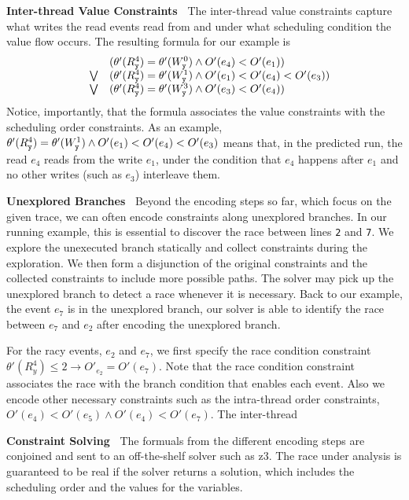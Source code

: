 {\bf Inter-thread Value Constraints\ } The inter-thread value constraints capture what writes the read events read from and under what scheduling condition the value flow occurs.  The resulting formula for our example is
$$
\begin{array}{lcl}
	& & (\theta'(R_{\tt y}^4)=\theta'(W_{\tt y}^0) \wedge O'(e_4) < O'(e_1) ) \\
& \bigvee &
	(\theta'(R_{\tt y}^4)=\theta'(W_{\tt y}^1) \wedge O'(e_1) < O'(e_4) < O'(e_3)) \\
& \bigvee &
	(\theta'(R_{\tt y}^4)=\theta'(W_{\tt y}^3) \wedge O'(e_3) < O'(e_4))
\end{array}
$$    
Notice, importantly, that the formula associates the value constraints with the scheduling order constraints. 
 As an example, 
$\theta'(R_{\tt y}^4)=\theta'(W_{\tt y}^1) \wedge O'(e_1) < O'(e_4) < O'(e_3)$ means that, in the predicted run, the read $e_4$ reads from the write $e_1$, under the condition that $e_4$ happens after $e_1$ and no other  writes (such as $e_3$) interleave them.



{\bf Unexplored Branches\ } Beyond the encoding steps so far, which focus on the given trace, we can often encode constraints along unexplored branches. In our running example, this is essential to discover the race between lines {\tt 2} and {\tt 7}. We explore the unexecuted branch statically and collect constraints during the exploration. We then form a disjunction  of the original constraints and the collected constraints to include more possible  paths. The solver may pick up the unexplored branch to detect a race whenever it is necessary. Back to our example, the event $e_7$ is in the unexplored branch, our solver is able to identify the race between $e_7$ and $e_2$ after encoding the unexplored branch. 

For the racy events, $e_2$ and $e_7$, we first specify the race condition constraint  $\theta'(R^4_y)\leq 2\rightarrow O'_{e_2}=O'(e_7)$. Note that the race condition constraint associates the race with the branch condition that enables each event.  Also we encode other necessary constraints such as the intra-thread order constraints, $O'(e_4)<O'(e_5)\wedge O'(e_4)<O'(e_7)$. The inter-thread 




{\bf Constraint Solving\ } The formuals from the different encoding steps are conjoined and sent to an off-the-shelf solver such as {\sf z3}.  The race under analysis is guaranteed to be real if the solver returns a solution, which includes the scheduling order and the values for the variables. 


